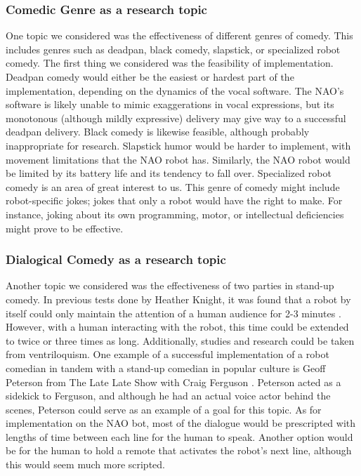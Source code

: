 \subsubsection{Comedic Genre as a research topic}
One topic we considered was the effectiveness of different genres of comedy.
This includes genres such as deadpan, black comedy, slapstick, or specialized robot comedy.
The first thing we considered was the feasibility of implementation.
Deadpan comedy would either be the easiest or hardest part of the implementation, depending on the dynamics of the vocal software.
The NAO's software is likely unable to mimic exaggerations in vocal expressions, but its monotonous (although mildly expressive) delivery may give way to a successful deadpan delivery.
Black comedy is likewise feasible, although probably inappropriate for research.
Slapstick humor would be harder to implement, with movement limitations that the NAO robot has.
Similarly, the NAO robot would be limited by its battery life and its tendency to fall over.
Specialized robot comedy is an area of great interest to us.
This genre of comedy might include robot-specific jokes; jokes that only a robot would have the right to make.
For instance, joking about its own programming, motor, or intellectual deficiencies might prove to be effective.


\subsubsection{Dialogical Comedy as a research topic}
Another topic we considered was the effectiveness of two parties in stand-up comedy.
In previous tests done by Heather Knight, it was found that a robot by itself could only maintain the attention of a human audience for 2-3 minutes \cite{OneNote:Anish}.
However, with a human interacting with the robot, this time could be extended to twice or three times as long.
Additionally, studies and research could be taken from ventriloquism.
One example of a successful implementation of a robot comedian in tandem with a stand-up comedian in popular culture is Geoff Peterson from The Late Late Show with Craig Ferguson \cite{GeoffPeterson}.
Peterson acted as a sidekick to Ferguson, and although he had an actual voice actor behind the scenes, Peterson could serve as an example of a goal for this topic.
As for implementation on the NAO bot, most of the dialogue would be prescripted with lengths of time between each line for the human to speak.
Another option would be for the human to hold a remote that activates the robot's next line, although this would seem much more scripted.


